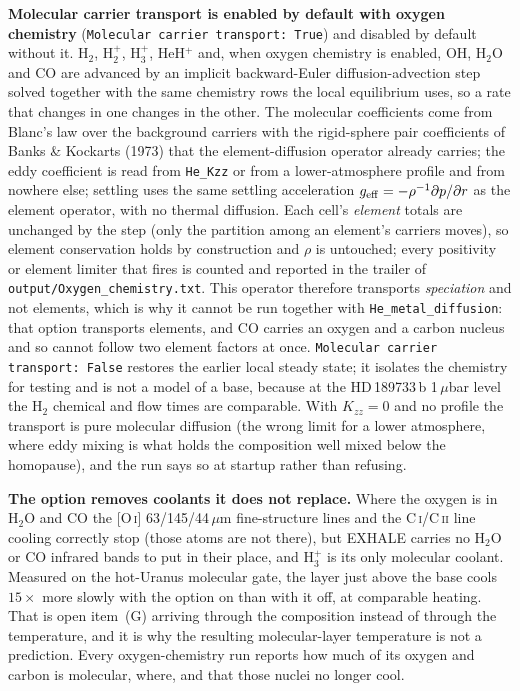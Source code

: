 \documentclass[english,a4paper]{my_memo}
\begin{document}
\textbf{Molecular carrier transport is enabled by default with oxygen chemistry}
(\texttt{Molecular carrier transport: True}) and disabled by default without
it. H$_2$, H$_2^+$, H$_3^+$, HeH$^+$ and, when oxygen chemistry is enabled,
OH, H$_2$O and CO are advanced by an
implicit backward-Euler diffusion-advection step solved together with the same
chemistry rows the local equilibrium uses, so a rate that changes in one changes
in the other. The molecular coefficients come from Blanc's law over the
background carriers with the rigid-sphere pair coefficients of Banks \&
Kockarts (1973) that the element-diffusion operator already carries; the eddy
coefficient is read from \texttt{He\_Kzz} or from a lower-atmosphere profile and
from nowhere else; settling uses the same settling acceleration
$g_{\rm eff}=-\rho^{-1}\partial p/\partial r$ as the element operator, with no
thermal diffusion. Each cell's \emph{element} totals are unchanged by the step
(only the partition among an element's carriers moves), so element
conservation holds by construction and $\rho$ is untouched; every positivity or
element limiter that fires is counted and reported in the trailer of
\texttt{output/Oxygen\_chemistry.txt}. This operator therefore transports
\emph{speciation} and not elements, which is why it cannot be run together with
\texttt{He\_metal\_diffusion}: that option transports elements, and CO carries an
oxygen and a carbon nucleus and so cannot follow two element factors at once.
\texttt{Molecular carrier transport: False}
restores the earlier local steady state; it isolates the chemistry for testing
and is not a model of a base, because at the HD\,189733\,b 1\,$\mu$bar level the
H$_2$ chemical and flow times are comparable. With $K_{zz}=0$ and no profile the
transport is pure molecular diffusion (the wrong limit for a lower
atmosphere, where eddy mixing is what holds the composition well mixed below the
homopause), and the run says so at startup rather than refusing.

\textbf{The option removes coolants it does not replace.} Where the oxygen is in
H$_2$O and CO the [O\,\textsc{i}] 63/145/44\,$\mu$m fine-structure lines and the
C\,\textsc{i}/C\,\textsc{ii} line cooling correctly stop (those atoms are not
there), but EXHALE carries no H$_2$O or CO infrared bands to put in their
place, and H$_3^+$ is its only molecular coolant. Measured on the hot-Uranus
molecular gate, the layer just above the base cools $15\times$ more slowly with
the option on than with it off, at comparable heating. That is open item~(G)
arriving through the composition instead of through the
temperature, and it is why the resulting molecular-layer temperature is not a
prediction. Every oxygen-chemistry run reports how much of its oxygen and
carbon is molecular, where, and that those nuclei no longer cool.
\end{document}
